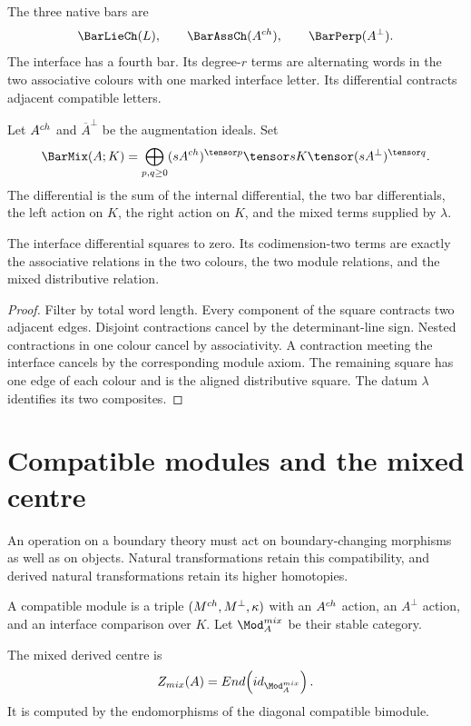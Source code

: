 The three native bars are
\[
 \BarLieCh(L),\qquad
 \BarAssCh(A^{\ch}),\qquad
 \BarPerp(A^\perp).
\]
The interface has a fourth bar.  Its degree-$r$ terms are alternating words in the two associative colours with one marked interface letter.  Its differential contracts adjacent compatible letters.

\begin{construction}
Let $A^{ch}$ and $\overline A^\perp$ be the augmentation ideals.  Set
\[
 \BarMix(\mathbb A;K)
 =\bigoplus_{p,q\ge0}
 (s\overline A^{\ch})^{\tensor p}\tensor sK\tensor
 (s\overline A^\perp)^{\tensor q}.
\]
The differential is the sum of the internal differential, the two bar differentials, the left action on $K$, the right action on $K$, and the mixed terms supplied by $\lambda$.
\end{construction}

\begin{theorem}
The interface differential squares to zero.  Its codimension-two terms are exactly the associative relations in the two colours, the two module relations, and the mixed distributive relation.
\end{theorem}
\begin{proof}
Filter by total word length.  Every component of the square contracts two adjacent edges.  Disjoint contractions cancel by the determinant-line sign.  Nested contractions in one colour cancel by associativity.  A contraction meeting the interface cancels by the corresponding module axiom.  The remaining square has one edge of each colour and is the aligned distributive square.  The datum $\lambda$ identifies its two composites.
\end{proof}

\chapter{Compatible modules and the mixed centre}
An operation on a boundary theory must act on boundary-changing morphisms as well as on objects. Natural transformations retain this compatibility, and derived natural transformations retain its higher homotopies.

A compatible module is a triple $(M^{ch},M^\perp,\kappa)$ with an $A^{ch}$ action, an $A^\perp$ action, and an interface comparison over $K$.  Let $\Mod_{\mathbb A}^{\mathrm{mix}}$ be their stable category.

\begin{definition}
The mixed derived centre is
\[
 Z_{\mathrm{mix}}(\mathbb A)
 =\End\!\left(\id_{\Mod_{\mathbb A}^{\mathrm{mix}}}\right).
\]
It is computed by the endomorphisms of the diagonal compatible bimodule.
\end{definition}

